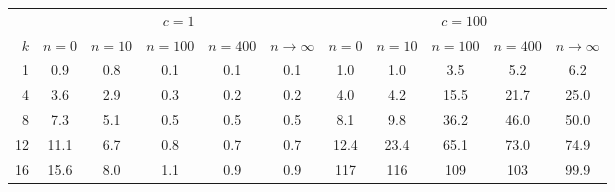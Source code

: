 \begin{tabular}{rcccccccccc}
\toprule
& \multicolumn{5}{c}{$c = 1$} & \multicolumn{5}{c}{$c = 100$} \\
\cmidrule(lr){2-6} \cmidrule(lr){7-11}
$k$ & $n = 0$ & $n = 10$ & $n = 100$ & $n = 400$ & $n \to \infty$ & $n = 0$ & $n = 10$ & $n = 100$ & $n = 400$ & $n \to \infty$ \\
\midrule
1 & 0.9 & 0.8 & 0.1 & 0.1 & 0.1 & 1.0 & 1.0 & 3.5 & 5.2 & 6.2 \\
4 & 3.6 & 2.9 & 0.3 & 0.2 & 0.2 & 4.0 & 4.2 & 15.5 & 21.7 & 25.0 \\
8 & 7.3 & 5.1 & 0.5 & 0.5 & 0.5 & 8.1 & 9.8 & 36.2 & 46.0 & 50.0 \\
12 & 11.1 & 6.7 & 0.8 & 0.7 & 0.7 & 12.4 & 23.4 & 65.1 & 73.0 & 74.9 \\
16 & 15.6 & 8.0 & 1.1 & 0.9 & 0.9 & 117 & 116 & 109 & 103 & 99.9 \\
\bottomrule
\end{tabular}
